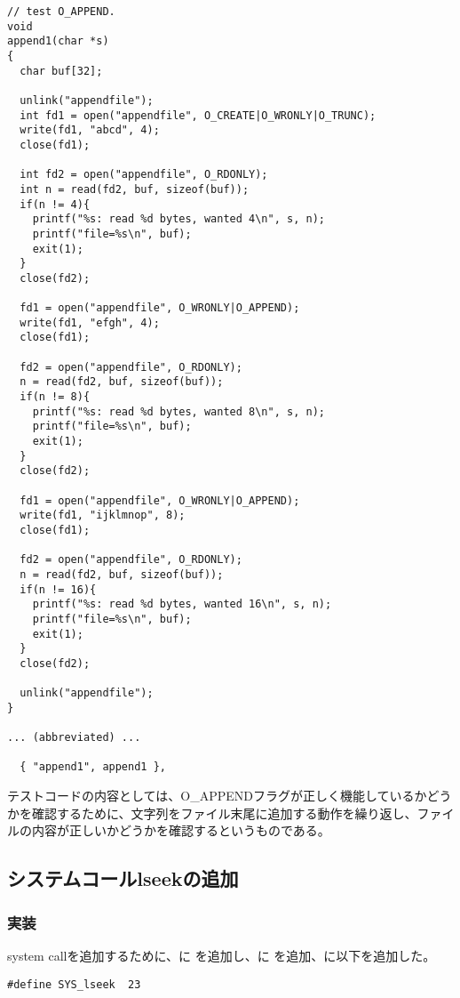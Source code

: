 \documentclass[platex,dvipdfmx, titlepage]{jlreq} %
\begin{document}
\begin{lstlisting}[caption={user/usertests.c}]
// test O_APPEND.
void
append1(char *s)
{
  char buf[32];

  unlink("appendfile");
  int fd1 = open("appendfile", O_CREATE|O_WRONLY|O_TRUNC);
  write(fd1, "abcd", 4);
  close(fd1);

  int fd2 = open("appendfile", O_RDONLY);
  int n = read(fd2, buf, sizeof(buf));
  if(n != 4){
    printf("%s: read %d bytes, wanted 4\n", s, n);
    printf("file=%s\n", buf);
    exit(1);
  }
  close(fd2);

  fd1 = open("appendfile", O_WRONLY|O_APPEND);
  write(fd1, "efgh", 4);
  close(fd1);

  fd2 = open("appendfile", O_RDONLY);
  n = read(fd2, buf, sizeof(buf));
  if(n != 8){
    printf("%s: read %d bytes, wanted 8\n", s, n);
    printf("file=%s\n", buf);
    exit(1);
  }
  close(fd2);

  fd1 = open("appendfile", O_WRONLY|O_APPEND);
  write(fd1, "ijklmnop", 8);
  close(fd1);

  fd2 = open("appendfile", O_RDONLY);
  n = read(fd2, buf, sizeof(buf));
  if(n != 16){
    printf("%s: read %d bytes, wanted 16\n", s, n);
    printf("file=%s\n", buf);
    exit(1);
  }
  close(fd2);

  unlink("appendfile");
}

... (abbreviated) ...

  { "append1", append1 },
\end{lstlisting}

テストコードの内容としては、O\_APPENDフラグが正しく機能しているかどうかを確認するために、文字列をファイル末尾に追加する動作を繰り返し、ファイルの内容が正しいかどうかを確認するというものである。

\subsection{システムコールlseekの追加}

\subsubsection*{実装}

system callを追加するために、に を追加し、に を追加、に以下を追加した。

\begin{lstlisting}[caption={kernel/sysycall.h}]
    #define SYS_lseek  23
\end{lstlisting}
\end{document}
